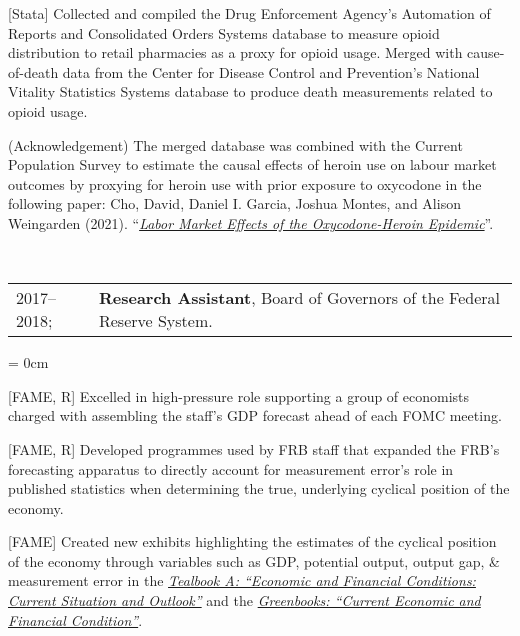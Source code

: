 \documentclass[a4paper, 10pt]{article}
\begin{document}
\begin{compactitem}
    \item {[Stata]} Collected and compiled the Drug Enforcement Agency's Automation of Reports and Consolidated Orders Systems database to measure opioid distribution to retail pharmacies as a proxy for opioid usage. Merged with cause-of-death data from the Center for Disease Control and Prevention's National Vitality Statistics Systems database to produce death measurements related to opioid usage.
    \begin{compactitem}
      \item {(Acknowledgement)} The merged database was combined with the Current Population Survey to estimate the causal effects of heroin use on labour market outcomes by proxying for heroin use with prior exposure to oxycodone in the following paper: Cho, David, Daniel I. Garcia, Joshua Montes, and Alison Weingarden (2021). ``\href{https://doi.org/10.17016/FEDS.2021.025}{\textit{Labor Market Effects of the Oxycodone-Heroin Epidemic}}''.
    \end{compactitem}
  \end{compactitem}
  \vspace*{1.25em}
      
  ~\begin{tabular}{ll}
    2017--2018; & \textbf{Research Assistant}, Board of Governors of the Federal Reserve System.
  \end{tabular}
  \begin{compactitem}\parskip = 0cm
    \item {[FAME, R]} Excelled in high-pressure role supporting a group of economists charged with assembling the staff's GDP forecast ahead of each FOMC meeting.
    \item {[FAME, R]} Developed programmes used by FRB staff that expanded the FRB's forecasting apparatus to directly account for measurement error's role in published statistics when determining the true, underlying cyclical position of the economy.
    \item {[FAME]} Created new exhibits highlighting the estimates of the cyclical position of the economy through variables such as GDP, potential output, output gap, \& measurement error in the \href{https://www.federalreserve.gov/monetarypolicy/fomc_historical.htm#tealbooks}{\textit{Tealbook A: ``Economic and Financial Conditions: Current Situation and Outlook''}} and the \href{https://www.federalreserve.gov/monetarypolicy/fomc_historical.htm#greenbooks}{\textit{Greenbooks: ``Current Economic and Financial Condition''}}.
  \end{compactitem}
  \vspace*{0.25em}
      
\end{document}
